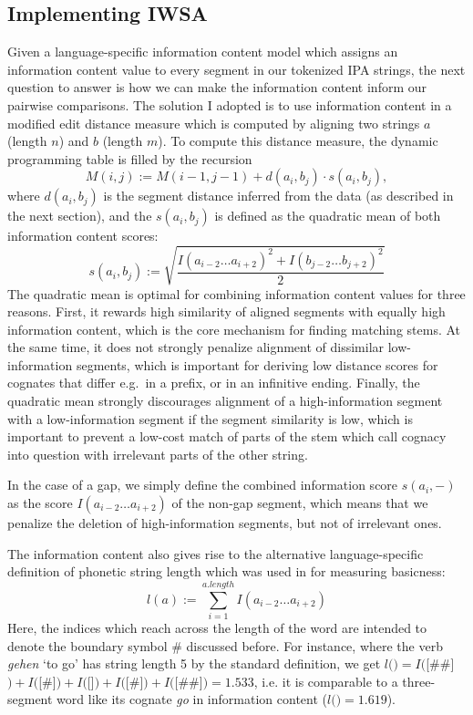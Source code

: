 \subsection{Implementing IWSA}
Given a language-specific information content model which assigns an information content value to every segment in our tokenized IPA strings, the next question to answer is how we can make the information content inform our pairwise comparisons. The solution I adopted is to use information content in a modified edit distance measure which is computed by aligning two strings $a$ (length $n$) and $b$ (length $m$). To compute this distance measure, the dynamic programming table is filled by the recursion
\begin{equation}
 M(i,j) := M(i-1,j-1) + d(a_i,b_j) \cdot s(a_i,b_j),
\end{equation}
where $d(a_i,b_j)$ is the segment distance inferred from the data (as described in the next section), and the  $s(a_i,b_j)$ is defined as the quadratic mean of both information content scores:
\begin{equation}
 s(a_i,b_j) := \sqrt{\frac{I(a_{i-2}\dots a_{i+2})^2 + I(b_{j-2}\dots b_{j+2})^2}{2}}
\end{equation}
The quadratic mean is optimal for combining information content values for three reasons. First, it rewards high similarity of aligned segments with equally high information content, which is the core mechanism for finding matching stems. At the same time, it does not strongly penalize alignment of dissimilar low-information segments, which is important for deriving low distance scores for cognates that differ e.g.\ in a prefix, or in an infinitive ending. Finally, the quadratic mean strongly discourages alignment of a high-information segment with a low-information segment if the segment similarity is low, which is important to prevent a low-cost match of parts of the stem which call cognacy into question with irrelevant parts of the other string.

In the case of a gap, we simply define the combined information score $s(a_i,-)$ as the score $I(a_{i-2}\dots a_{i+2})$ of the non-gap segment, which means that we penalize the deletion of high-information segments, but not of irrelevant ones.

The information content also gives rise to the alternative language-specific definition of phonetic string length which was used in \cite{dellert_buch_2015} for measuring basicness:
\begin{equation}
  l(a) := \sum_{i=1}^{a.length} I(a_{i-2}\dots a_{i+2})
\end{equation}
Here, the indices which reach across the length of the word are intended to denote the boundary symbol $\#$ discussed before. For instance, where the  verb \textit{gehen} \ipa{[gee@n]} `to go' has string length 5 by the standard definition, we get $l($\ipa{[gee@n]}$) = I($[\#\#]$) + I($[\#]$) + I($[]$) + I($[\#]$) + I($[\#\#]$) = 1.533$, i.e. it is comparable to a three-segment word like its  cognate \textit{go} in information content ($l($\ipa{[g@U]}$) = 1.619$).

